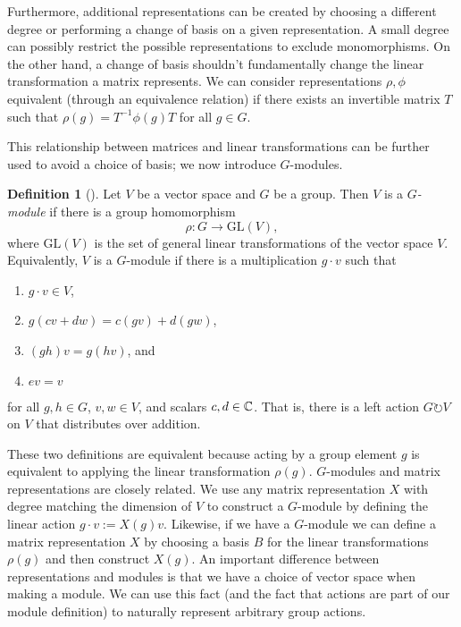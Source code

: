 \documentclass[12pt,twoside]{reedthesis}
\theoremstyle{plain}   %
\theoremstyle{definition}
\newtheorem{defn}{Definition}[section]
\theoremstyle{remark}
\numberwithin{equation}{section}
\def\GL{\mathrm{GL}} \def\SL{\mathrm{SL}}  \def\SP{\mathrm{SL}}\def\OG{\mathrm{O}}
\def\acts{\circlearrowright} %
\begin{document}
  Furthermore, additional representations can be created by choosing a different degree or performing a change of basis on a given representation.
  A small degree can possibly restrict the possible representations to exclude monomorphisms.
  On the other hand, a change of basis shouldn't fundamentally change the linear transformation a matrix represents.
  We can consider representations $\rho, \phi$ equivalent (through an equivalence relation) if there exists an invertible matrix $T$
  such that $\rho(g) = T^{-1} \phi(g) T$ for all $g \in G$.\par
  This relationship between matrices and linear transformations can be further used to avoid a choice of basis; we now introduce
  $G$-modules.
  \begin{defn}[{\cite[Definition 1.3.1]{sagan}}]
    Let $V$ be a vector space and $G$ be a group. Then $V$ is a \emph{$G$-module} if there is a group homomorphism
    \[\rho: G \to \GL(V),\]
    where $\GL(V)$ is the set of general linear transformations of the vector space $V$.
    Equivalently, $V$ is a $G$-module if there is a multiplication $g \cdot v$ such that
    \begin{enumerate}
    \item $g \cdot v \in V$,
    \item $g(cv + dw) = c(gv) + d(gw)$,
    \item $(gh)v = g(hv)$, and
    \item $ev = v$
    \end{enumerate}
    for all $g,h \in G$, $v,w \in V$, and scalars $c,d \in \mathbb{C}$.
    That is, there is a left action $G \acts V$ on $V$ that distributes over addition.
  \end{defn}
  These two definitions are equivalent because acting by a group element $g$ is equivalent to applying the linear transformation $\rho(g)$.
  $G$-modules and matrix representations are closely related. We use any matrix representation $X$ with degree matching the dimension of $V$
  to construct a $G$-module by defining the linear action $g \cdot v := X(g) v$. Likewise, if we have a $G$-module we can define
  a matrix representation $X$ by choosing a basis $B$ for the linear transformations $\rho(g)$ and then construct $X(g)$.
  An important difference between representations and modules is that we have a choice of vector space when making a module.
  We can use this fact (and the fact that actions are part of our module definition) to naturally represent arbitrary group actions.
\end{document}
